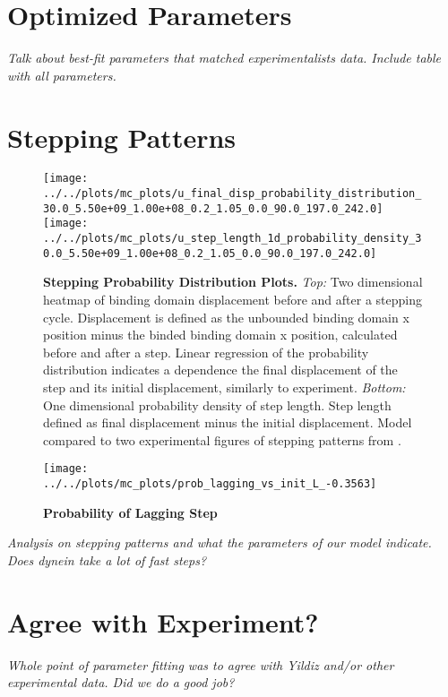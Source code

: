 \section{Optimized Parameters}
\textit{Talk about best-fit parameters that matched experimentalists data. Include table with all parameters.}
\section{Stepping Patterns}
\begin{figure}[H]
	\centering
	\texttt{[image: ../../plots/mc\_plots/u\_final\_disp\_probability\_distribution\_30.0\_5.50e+09\_1.00e+08\_0.2\_1.05\_0.0\_90.0\_197.0\_242.0]}
	\texttt{[image: ../../plots/mc\_plots/u\_step\_length\_1d\_probability\_density\_30.0\_5.50e+09\_1.00e+08\_0.2\_1.05\_0.0\_90.0\_197.0\_242.0]}
	\caption[Final Displacement Probability Distribution]{\textbf{Stepping Probability Distribution Plots.} \textit{Top:} Two dimensional heatmap of binding domain displacement before and after a stepping cycle. Displacement is defined as the unbounded binding domain x position minus the binded binding domain x position, calculated before and after a step. Linear regression of the probability distribution indicates a dependence the final displacement of the step and its initial displacement, similarly to experiment. \textit{Bottom:} One dimensional probability density of step length. Step length defined as final displacement minus the initial displacement. Model compared to two experimental figures of stepping patterns from \citep{Dewitt2012}.} 
	\label{fig:final_disp}
\end{figure}


\begin{figure}[H]
	\centering
	\texttt{[image: ../../plots/mc\_plots/prob\_lagging\_vs\_init\_L\_-0.3563]}
	\caption[Probability of Lagging Step]{\textbf{Probability of Lagging Step}}
	\label{fig:step_length}
\end{figure}

\textit{Analysis on stepping patterns and what the parameters of our model indicate. Does dynein take a lot of fast steps?}

\section{Agree with Experiment?}
\textit{Whole point of parameter fitting was to agree with Yildiz and/or other experimental data. Did we do a good job?}